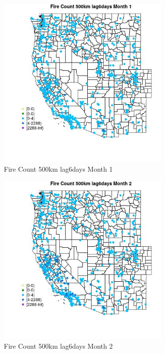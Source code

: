 \begin{figure} 
\centering  
\includegraphics[width=0.77\textwidth]{Code_Outputs/Report_ML_input_PM25_Step4_part_e_de_duplicated_aves_compiled_2019-05-21wNAs_MapObsMo1Fire_Count_500km_lag6days.jpg} 
\caption{\label{fig:Report_ML_input_PM25_Step4_part_e_de_duplicated_aves_compiled_2019-05-21wNAsMapObsMo1Fire_Count_500km_lag6days}Fire Count 500km lag6days Month 1} 
\end{figure} 
 

\begin{figure} 
\centering  
\includegraphics[width=0.77\textwidth]{Code_Outputs/Report_ML_input_PM25_Step4_part_e_de_duplicated_aves_compiled_2019-05-21wNAs_MapObsMo2Fire_Count_500km_lag6days.jpg} 
\caption{\label{fig:Report_ML_input_PM25_Step4_part_e_de_duplicated_aves_compiled_2019-05-21wNAsMapObsMo2Fire_Count_500km_lag6days}Fire Count 500km lag6days Month 2} 
\end{figure} 
 

